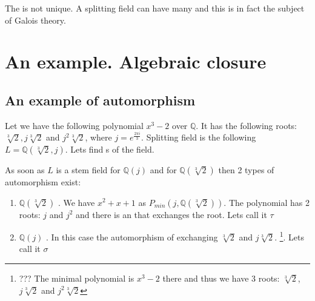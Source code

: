 \begin{remark}
  The  is not unique. A splitting field  can
  have many  and this is in fact the subject
  of Galois theory.
\end{remark}

\section{An example. Algebraic closure}

\subsection{An example of automorphism}

\begin{example}
  Let we have the following polynomial $x^3-2$ over $\mathbb{Q}$. It
  has the following roots: $\sqrt[3]{2}, j\sqrt[3]{2}$ and
  $j^2\sqrt[3]{2}$, where $j = e^{\frac{2 \pi i}{3}}$. Splitting field
  is the following $L = \mathbb{Q}\left(\sqrt[3]{2}, j\right)$. Lets
  find s of the field.


  As soon as $L$ is a stem field for $\mathbb{Q}\left(j\right)$ 
  and for $\mathbb{Q}\left(\sqrt[3]{2}\right)$ then 2 types of
  automorphism exist:
  \begin{enumerate}
    \item $\mathbb{Q}\left(\sqrt[3]{2}\right)$
      . We have
      $x^2+x+1$ as
      $P_{min}\left(j, \mathbb{Q}\left(\sqrt[3]{2}\right)\right)$. The
      polynomial has 2 roots: $j$ and $j^2$ and there is an
       that exchanges the root. Lets call it
      $\tau$
      \item $\mathbb{Q}\left(j\right)$ . In
        this case the automorphism of exchanging $\sqrt[3]{2}$ and
        $j \sqrt[3]{2}$. \footnote{
          ??? The minimal polynomial is $x^3 - 2$ there and thus we
          have 3 roots: $\sqrt[3]{2}$, $j \sqrt[3]{2}$ and $j^2
          \sqrt[3]{2}$ 
        }. Lets call it $\sigma$
  \end{enumerate}


\end{example}
